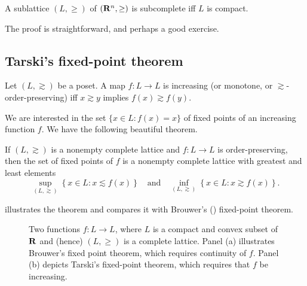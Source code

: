 \documentclass[11pt,letterpaper,reqno,oneside]{article}
\begin{document}
\begin{theorem}
	A sublattice $(L,\geq)$ of $\left(\mathbf{R}^n,\geq\right)$ is subcomplete iff $L$ is compact.
\end{theorem}

The proof is straightforward, and perhaps a good exercise.



\subsection{Tarski's fixed-point theorem}
\label{sec:supermodular:tarski}

\begin{definition}
	Let $(L,\gtrsim)$ be a poset. A map $f : L \to L$ is increasing (or monotone, or $\gtrsim$-order-preserving) iff $x \gtrsim y$ implies $f(x) \gtrsim f(y)$.
\end{definition}

We are interested in the set $\{ x \in L : f(x) = x \}$ of fixed points of an increasing function $f$. We have the following beautiful theorem.

\begin{theorem}
	\label{theorem:Tarski}
	If $(L,\gtrsim)$ is a nonempty complete lattice and $f : L \to L$ is order-preserving, then the set of fixed points of $f$ is a nonempty complete lattice with greatest and least elements
	\begin{equation*}
		\sup_{(L,\gtrsim)} \left\{ x \in L : x \lesssim f(x) \right\}
		\quad\text{and}\quad
		\inf_{(L,\gtrsim)} \left\{ x \in L : x \gtrsim f(x) \right\} .
	\end{equation*}
\end{theorem}

\noindent {} illustrates the theorem and compares it with Brouwer's (\citeyear{Brouwer1912}) fixed-point theorem.
%
\begin{figure}
	\begin{subfigure}{0.5\textwidth}
		\centering
		
		\caption{}
	\end{subfigure}
	\begin{subfigure}{0.5\textwidth}
		\centering
		
		\caption{}
	\end{subfigure}
	\caption{Two functions $f : L \to L$, where $L$ is a compact and convex subset of $\mathbf{R}$ and (hence) $(L,\geq)$ is a complete lattice. Panel (a) illustrates Brouwer's fixed point theorem, which requires continuity of $f$. Panel (b) depicts Tarski's fixed-point theorem, which requires that $f$ be increasing.}
	\label{fig:brouwer_vs_tarski}
\end{figure}
\end{document}
